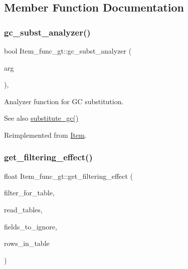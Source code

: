 \subsection{Member Function Documentation}
\mbox{\label{classItem__func__gt_a1b58f75ad3398ed88cf619f1d54109a8}} 
\subsubsection{\texorpdfstring{gc\+\_\+subst\+\_\+analyzer()}{gc\_subst\_analyzer()}}
{\footnotesize\ttfamily bool Item\+\_\+func\+\_\+gt\+::gc\+\_\+subst\+\_\+analyzer (\begin{DoxyParamCaption}\item[{uchar $\ast$$\ast$}]{arg }\end{DoxyParamCaption})\hspace{0.3cm}{\ttfamily [inline]}, {\ttfamily [virtual]}}

Analyzer function for GC substitution. \begin{DoxySeeAlso}{See also}
\mbox{\hyperlink{group__Query__Optimizer_gaa95a062cdd785687a638e01d7ad85d11}{substitute\+\_\+gc()}} 
\end{DoxySeeAlso}


Reimplemented from \mbox{\hyperlink{classItem_aea5d6f41e9cd5d17d8e6e8d44bee9c3e}{Item}}.

\mbox{\label{classItem__func__gt_a01c0dea29d81f8f99c9a856381c20351}} 
\subsubsection{\texorpdfstring{get\+\_\+filtering\+\_\+effect()}{get\_filtering\_effect()}}
{\footnotesize\ttfamily float Item\+\_\+func\+\_\+gt\+::get\+\_\+filtering\+\_\+effect (\begin{DoxyParamCaption}\item[{table\+\_\+map}]{filter\+\_\+for\+\_\+table,  }\item[{table\+\_\+map}]{read\+\_\+tables,  }\item[{const M\+Y\+\_\+\+B\+I\+T\+M\+AP $\ast$}]{fields\+\_\+to\+\_\+ignore,  }\item[{double}]{rows\+\_\+in\+\_\+table }\end{DoxyParamCaption})\hspace{0.3cm}{\ttfamily [virtual]}}

